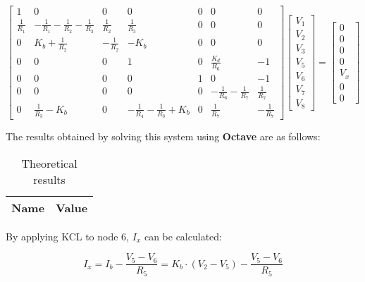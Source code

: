 \begin{equation}
  \begin{bmatrix}
    1 & 0 & 0 & 0 & 0 & 0 & 0 \\
    \frac{1}{R_1} & -\frac{1}{R_1}-\frac{1}{R_2}-\frac{1}{R_3} & \frac{1}{R_2} & \frac{1}{R_3} & 0 & 0 & 0 \\
    0 & K_b + \frac{1}{R_2} & -\frac{1}{R_2} & -K_b & 0 & 0 & 0 \\
    0 & 0 & 0 & 1 & 0 & \frac{K_d}{R_6} & -1 \\
    0 & 0 & 0 & 0 & 1 & 0 & -1 \\
    0 & 0 & 0 & 0 & 0 & -\frac{1}{R_6}-\frac{1}{R_7} & \frac{1}{R_7} \\
    0 & \frac{1}{R_3}-K_b & 0 & -\frac{1}{R_4}-\frac{1}{R_3}+K_b & 0 & \frac{1}{R_7} & -\frac{1}{R_7}
  \end{bmatrix}
  \begin{bmatrix}
    V_1 \\
    V_2 \\
    V_3 \\
    V_5 \\
    V_6 \\
    V_7 \\
    V_8
  \end{bmatrix}
  =
  \begin{bmatrix}
    0 \\
    0 \\
    0 \\
    0 \\
    V_x \\
    0 \\
    0
  \end{bmatrix}
\end{equation}

The results obtained by solving this system using \textbf{Octave} are as follows:

\begin{table}[H]
  \centering
  \begin{tabular}{|c|c|}
    \hline
        {\bf Name} & {\bf Value} \\
        \hline
        \hline
        
        \hline
  \end{tabular}
  \caption{Theoretical results}
\end{table}

By applying KCL to node 6, $I_x$ can be calculated:

\begin{equation}
  I_x = I_b - \frac{V_5-V_6}{R_5} = K_b \cdot (V_2-V_5) - \frac{V_5-V_6}{R_5} 
\end{equation}

